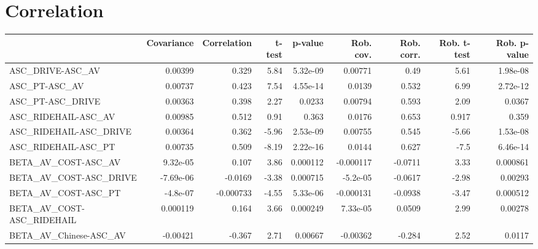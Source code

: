 \section{Correlation}
\begin{tabular}{lrrrrrrrr}
\toprule
{} &  Covariance &  Correlation &   t-test &  p-value &  Rob. cov. &  Rob. corr. &  Rob. t-test &  Rob. p-value \\
\midrule
ASC\_DRIVE-ASC\_AV                                   &     0.00399 &        0.329 &     5.84 & 5.32e-09 &    0.00771 &        0.49 &         5.61 &      1.98e-08 \\
ASC\_PT-ASC\_AV                                      &     0.00737 &        0.423 &     7.54 & 4.55e-14 &     0.0139 &       0.532 &         6.99 &      2.72e-12 \\
ASC\_PT-ASC\_DRIVE                                   &     0.00363 &        0.398 &     2.27 &   0.0233 &    0.00794 &       0.593 &         2.09 &        0.0367 \\
ASC\_RIDEHAIL-ASC\_AV                                &     0.00985 &        0.512 &     0.91 &    0.363 &     0.0176 &       0.653 &        0.917 &         0.359 \\
ASC\_RIDEHAIL-ASC\_DRIVE                             &     0.00364 &        0.362 &    -5.96 & 2.53e-09 &    0.00755 &       0.545 &        -5.66 &      1.53e-08 \\
ASC\_RIDEHAIL-ASC\_PT                                &     0.00735 &        0.509 &    -8.19 & 2.22e-16 &     0.0144 &       0.627 &         -7.5 &      6.46e-14 \\
BETA\_AV\_COST-ASC\_AV                                &    9.32e-05 &        0.107 &     3.86 & 0.000112 &  -0.000117 &     -0.0711 &         3.33 &      0.000861 \\
BETA\_AV\_COST-ASC\_DRIVE                             &   -7.69e-06 &      -0.0169 &    -3.38 & 0.000715 &   -5.2e-05 &     -0.0617 &        -2.98 &       0.00293 \\
BETA\_AV\_COST-ASC\_PT                                &    -4.8e-07 &    -0.000733 &    -4.55 & 5.33e-06 &  -0.000131 &     -0.0938 &        -3.47 &      0.000512 \\
BETA\_AV\_COST-ASC\_RIDEHAIL                          &    0.000119 &        0.164 &     3.66 & 0.000249 &   7.33e-05 &      0.0509 &         2.99 &       0.00278 \\
BETA\_AV\_Chinese-ASC\_AV                             &    -0.00421 &       -0.367 &     2.71 &  0.00667 &   -0.00362 &      -0.284 &         2.52 &        0.0117 \\

\end{tabular}
